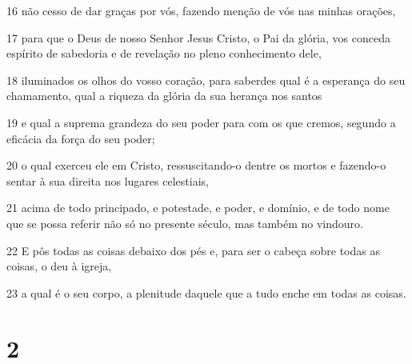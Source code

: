 \par 16 não cesso de dar graças por vós, fazendo menção de vós nas minhas orações,
\par 17 para que o Deus de nosso Senhor Jesus Cristo, o Pai da glória, vos conceda espírito de sabedoria e de revelação no pleno conhecimento dele,
\par 18 iluminados os olhos do vosso coração, para saberdes qual é a esperança do seu chamamento, qual a riqueza da glória da sua herança nos santos
\par 19 e qual a suprema grandeza do seu poder para com os que cremos, segundo a eficácia da força do seu poder;
\par 20 o qual exerceu ele em Cristo, ressuscitando-o dentre os mortos e fazendo-o sentar à sua direita nos lugares celestiais,
\par 21 acima de todo principado, e potestade, e poder, e domínio, e de todo nome que se possa referir não só no presente século, mas também no vindouro.
\par 22 E pôs todas as coisas debaixo dos pés e, para ser o cabeça sobre todas as coisas, o deu à igreja,
\par 23 a qual é o seu corpo, a plenitude daquele que a tudo enche em todas as coisas.

\chapter{2}

